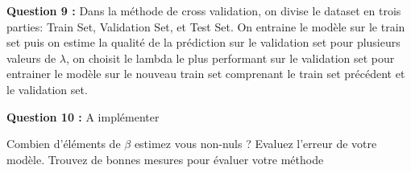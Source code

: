 \documentclass{article}
\begin{document}
\textbf{Question 9 :}
Dans la méthode de cross validation, on divise le dataset en trois parties: 
Train Set, Validation Set, et Test Set.
On entraine le modèle sur le train set puis on estime la qualité de la prédiction sur le validation set pour plusieurs valeurs de $\lambda$, on choisit le lambda le plus performant sur le validation set pour entrainer le modèle sur le nouveau train set comprenant le train set précédent et le validation set.

\textbf{Question 10 :}
A implémenter

Combien d’éléments de $\beta$ estimez vous non-nuls ? Evaluez l’erreur de votre modèle. Trouvez
de bonnes mesures pour évaluer votre méthode
\end{document}
